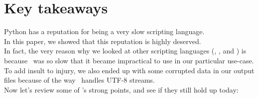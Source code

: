 \bigskip

\section*{Key takeaways}

Python has a reputation for being a very slow scripting language. \\

In this paper, we showed that this reputation is highly deserved. \\

In fact, the very reason why we looked at other scripting languages (\awk, \perl, and \julia) is because \python\ was so slow that it became impractical to use in our particular use-case. 
To add insult to injury, we also ended up with some corrupted data in our output files because of the way \python\ handles UTF-8 streams. \\


Now let's review some of \python's strong points, and see if they still hold up today:


